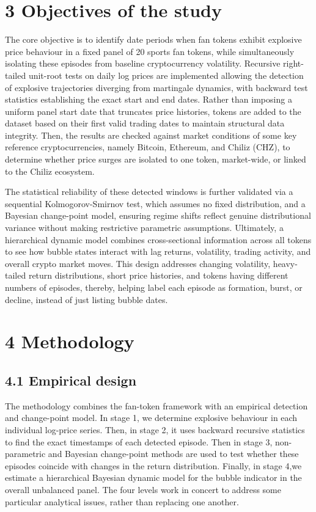 \documentclass[11pt,a4paper,onecolumn]{article}
\begin{document}
\section{3 Objectives of the study}

The core objective is to identify date periods when fan tokens exhibit explosive price behaviour in a fixed panel of 20 sports fan tokens, while simultaneously isolating these episodes from baseline cryptocurrency volatility. Recursive right-tailed unit-root tests on daily log prices are implemented allowing the detection of explosive trajectories diverging from martingale dynamics, with backward test statistics establishing the exact start and end dates. Rather than imposing a uniform panel start date that truncates price histories, tokens are added to the dataset based on their first valid trading dates to maintain structural data integrity. Then, the results are checked against market conditions of some key reference cryptocurrencies, namely Bitcoin, Ethereum, and Chiliz (CHZ), to determine whether price surges are isolated to one token, market-wide, or linked to the Chiliz ecosystem.

The statistical reliability of these detected windows is further validated via a sequential Kolmogorov-Smirnov test, which assumes no fixed distribution, and a Bayesian change-point model, ensuring regime shifts reflect genuine distributional variance without making restrictive parametric assumptions. Ultimately, a hierarchical dynamic model combines cross-sectional information across all tokens to see how bubble states interact with lag returns, volatility, trading activity, and overall crypto market moves. This design addresses changing volatility, heavy-tailed return distributions, short price histories, and tokens having different numbers of episodes, thereby, helping label each episode as formation, burst, or decline, instead of just listing bubble dates.

\section{4 Methodology}

\subsection{4.1 Empirical design}

The methodology combines the fan-token framework with an empirical detection and change-point model. In stage 1, we determine explosive behaviour in each individual log-price series. Then, in stage 2, it uses backward recursive statistics to find the exact timestamps of each detected episode. Then in stage 3,  non-parametric and Bayesian change-point methods are used to test whether these episodes coincide with changes in the return distribution. Finally, in stage 4,we estimate a hierarchical Bayesian dynamic model for the bubble indicator in the overall unbalanced panel. The four levels work in concert to address some particular analytical issues, rather than replacing one another.
\end{document}
